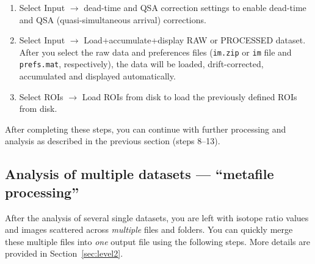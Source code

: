 \documentclass[a4paper, 11pt]{article}
\newcommand{\ttt}[1]{\texttt{#1}}
\newcommand{\lans}[1]{{\color{magenta}#1}}
\newcommand\ra{\rightarrow}
\newcommand\addon[1]{-- {\small #1}}
\newcounter{step}
\begin{document}
\begin{enumerate}

\item Select \lans{Input} $\ra$ \lans{dead-time and QSA correction settings} to enable dead-time and QSA (quasi-simultaneous arrival) corrections.

\item Select \lans{Input} $\ra$ \lans{Load+accumulate+display RAW or PROCESSED dataset}. After you select the raw data and preferences files (\ttt{im.zip} or \ttt{im} file and \ttt{prefs.mat}, respectively), the data will be loaded, drift-corrected, accumulated and displayed automatically.


 
\item Select \lans{ROIs} $\ra$ \lans{Load ROIs from disk} to load the previously defined ROIs from disk.



\end{enumerate}
%
After completing these steps, you can continue with further processing and analysis as described in the previous section (steps 8--13).


\subsection{Analysis of multiple datasets --- ``metafile processing''}

After the analysis of several single datasets, you are left with isotope ratio values and images scattered across \emph{multiple} files and folders. You can quickly merge these multiple files into \emph{one} output file using the following steps. More details are provided in Section~\ref{sec:level2}.
\end{document}
